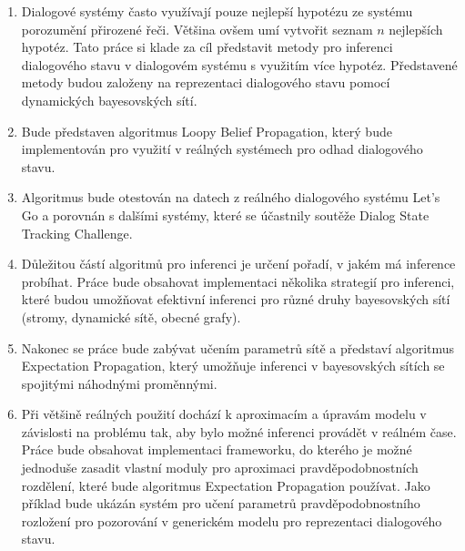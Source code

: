 \begin{enumerate}
\item Dialogové systémy často využívají pouze nejlepší hypotézu ze systému porozumění přirozené řeči.
    Většina ovšem umí vytvořit seznam $n$ nejlepších hypotéz.
    Tato práce si klade za cíl představit metody pro inferenci dialogového stavu v dialogovém systému s využitím více hypotéz.
    Představené metody budou založeny na reprezentaci dialogového stavu pomocí dynamických bayesovských sítí.
\item Bude představen algoritmus Loopy Belief Propagation, který bude implementován pro využití v reálných systémech pro odhad dialogového stavu.
\item Algoritmus bude otestován na datech z reálného dialogového systému Let's Go a porovnán s dalšími systémy, které se účastnily soutěže Dialog State Tracking Challenge.
\item Důležitou částí algoritmů pro inferenci je určení pořadí, v jakém má inference probíhat.
    Práce bude obsahovat implementaci několika strategií pro inferenci, které budou umožňovat efektivní inferenci pro různé druhy bayesovských sítí (stromy, dynamické sítě, obecné grafy).
\item Nakonec se práce bude zabývat učením parametrů sítě a představí algoritmus Expectation Propagation, který umožňuje inferenci v bayesovských sítích se spojitými náhodnými proměnnými.
\item Při většině reálných použití dochází k aproximacím a úpravám modelu v závislosti na problému tak, aby bylo možné inferenci provádět v reálném čase.
Práce bude obsahovat implementaci frameworku, do kterého je možné jednoduše zasadit vlastní moduly pro aproximaci pravděpodobnostních rozdělení, které bude algoritmus Expectation Propagation používat.
Jako příklad bude ukázán systém pro učení parametrů pravděpodobnostního rozložení pro pozorování v generickém modelu pro reprezentaci dialogového stavu.
\end{enumerate}
